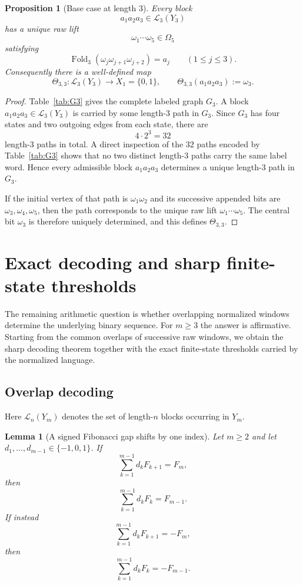 \documentclass[11pt,letterpaper]{article}
\numberwithin{equation}{section}
\theoremstyle{plain}
\newtheorem{lemma}[theorem]{Lemma}
\newtheorem{proposition}[theorem]{Proposition}
\theoremstyle{definition}
\theoremstyle{remark}
\DeclareMathOperator{\Fold}{Fold}
\begin{document}
\begin{proposition}[Base case at length $3$]
\label{prop:G3-base-case}
Every block
\[
a_1a_2a_3\in\mathcal L_3(Y_3)
\]
has a unique raw lift
\[
\omega_1\cdots\omega_5\in\Omega_5
\]
satisfying
\[
\Fold_3(\omega_j\omega_{j+1}\omega_{j+2})=a_j
\qquad (1\le j\le 3).
\]
Consequently there is a well-defined map
\[
\Theta_{3,3}:\mathcal L_3(Y_3)\to X_1=\{0,1\},
\qquad
\Theta_{3,3}(a_1a_2a_3):=\omega_3.
\]
\end{proposition}

\begin{proof}
Table~\ref{tab:G3} gives the complete labeled graph $G_3$.  A block
$a_1a_2a_3\in\mathcal L_3(Y_3)$ is carried by some length-$3$ path in $G_3$.
Since $G_3$ has four states and two outgoing edges from each state, there are
\[
4\cdot 2^3=32
\]
length-$3$ paths in total.  A direct inspection of the $32$ paths encoded by
Table~\ref{tab:G3} shows that no two distinct length-$3$ paths carry the same
label word.  Hence every admissible block $a_1a_2a_3$ determines a unique
length-$3$ path in $G_3$.

If the initial vertex of that path is $\omega_1\omega_2$ and its successive
appended bits are $\omega_3,\omega_4,\omega_5$, then the path corresponds to
the unique raw lift $\omega_1\cdots\omega_5$.  The central bit $\omega_3$ is
therefore uniquely determined, and this defines $\Theta_{3,3}$.
\end{proof}

\section{Exact decoding and sharp finite-state thresholds}

The remaining arithmetic question is whether overlapping normalized windows
determine the underlying binary sequence.  For $m\ge 3$ the answer is
affirmative.  Starting from the common overlaps of successive raw windows, we
obtain the sharp decoding theorem together with the exact finite-state
thresholds carried by the normalized language.

\subsection{Overlap decoding}

Here $\mathcal L_n(Y_m)$ denotes the set of length-$n$ blocks occurring in
$Y_m$.

\begin{lemma}[A signed Fibonacci gap shifts by one index]
\label{lem:signed-fibonacci-gap-shift}
Let $m\ge 2$ and let $d_1,\ldots,d_{m-1}\in\{-1,0,1\}$.  If
\[
\sum_{k=1}^{m-1} d_kF_{k+1}=F_m,
\]
then
\[
\sum_{k=1}^{m-1} d_kF_k=F_{m-1}.
\]
If instead
\[
\sum_{k=1}^{m-1} d_kF_{k+1}=-F_m,
\]
then
\[
\sum_{k=1}^{m-1} d_kF_k=-F_{m-1}.
\]
\end{lemma}
\end{document}
